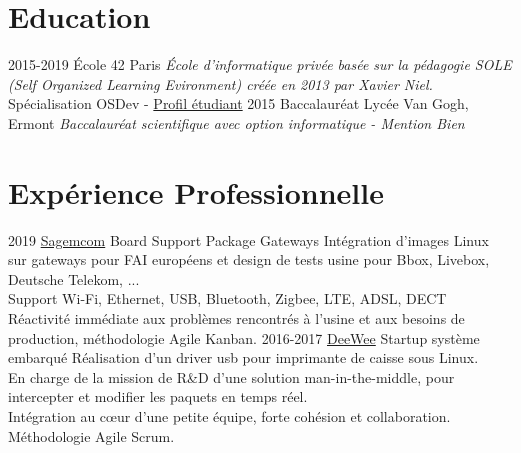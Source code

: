 \documentclass[]{twentysecondcv}
\begin{document}
\section{Education}

\begin{twenty}
  \twentyitem
    {2015-2019}
    {École 42}
    {Paris}
    {
		\emph{École d'informatique privée basée sur la pédagogie SOLE (Self Organized Learning Evironment) créée en 2013 par Xavier Niel.} \\
		Spécialisation OSDev - \href{https://cv.42.fr/tvermeil}{\textcolor{cerulean}{Profil étudiant}}
	}
  \twentyitem
    {2015}
    {Baccalauréat}
    {Lycée Van Gogh, Ermont}
    {\emph{Baccalauréat scientifique avec option informatique - Mention Bien}}
\end{twenty}


\section{Expérience Professionnelle}

\begin{twentyshort}
	\twentyitem
    {2019}
    {\href{https://www.sagemcom.com/broadband-solutions/}{\textcolor{cerulean}{Sagemcom}}}
    {Board Support Package Gateways}
    {
		Intégration d'images Linux sur gateways pour FAI européens et design de tests usine pour Bbox, Livebox, Deutsche Telekom, ... \\
		Support Wi-Fi, Ethernet, USB, Bluetooth, Zigbee, LTE, ADSL, DECT \\
		Réactivité immédiate aux problèmes rencontrés à l'usine et aux besoins de production, méthodologie Agile Kanban. 
	}
  \twentyitem
    {2016-2017}
    {\href{https://www.deewee.net/fr/}{\textcolor{cerulean}{DeeWee}}}
    {Startup système embarqué}
    {
		Réalisation d'un driver usb pour imprimante de caisse sous Linux. \\
		En charge de la mission de R\&D d'une solution man-in-the-middle,
		pour intercepter et modifier les paquets en temps réel. \\
		Intégration au cœur d'une petite équipe, forte cohésion et collaboration. \\
		Méthodologie Agile Scrum.
	}
\end{twentyshort}
\end{document}
